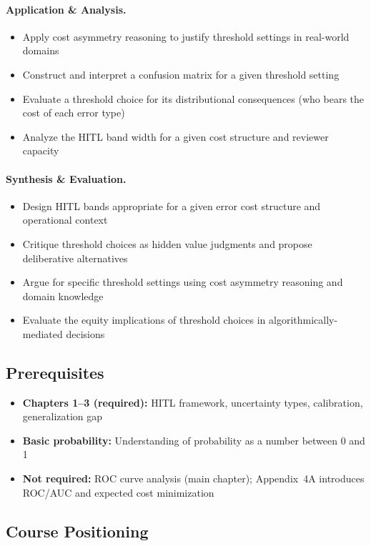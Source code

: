 \paragraph{Application \& Analysis.}
\begin{itemize}
    \item Apply cost asymmetry reasoning to justify threshold settings in real-world domains
    \item Construct and interpret a confusion matrix for a given threshold setting
    \item Evaluate a threshold choice for its distributional consequences (who bears the cost of each error type)
    \item Analyze the HITL band width for a given cost structure and reviewer capacity
\end{itemize}

\paragraph{Synthesis \& Evaluation.}
\begin{itemize}
    \item Design HITL bands appropriate for a given error cost structure and operational context
    \item Critique threshold choices as hidden value judgments and propose deliberative alternatives
    \item Argue for specific threshold settings using cost asymmetry reasoning and domain knowledge
    \item Evaluate the equity implications of threshold choices in algorithmically-mediated decisions
\end{itemize}

\subsection{Prerequisites}
\begin{itemize}
    \item \textbf{Chapters 1--3 (required):} HITL framework, uncertainty types, calibration, generalization gap
    \item \textbf{Basic probability:} Understanding of probability as a number between 0 and 1
    \item \textbf{Not required:} ROC curve analysis (main chapter); Appendix~4A introduces ROC/AUC and expected cost minimization
\end{itemize}

\subsection{Course Positioning}

